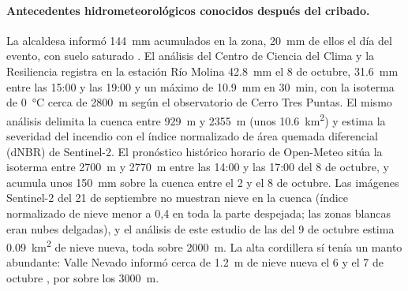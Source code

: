 \paragraph{Antecedentes hidrometeorológicos conocidos después del cribado.} La alcaldesa informó \SI{144}{mm} acumulados en la zona, \SI{20}{mm} de ellos el día del evento, con suelo saturado \citep{interferencia2026}. El análisis del Centro de Ciencia del Clima y la Resiliencia \citep{cr2_2026} registra en la estación Río Molina \SI{42,8}{mm} el 8 de octubre, \SI{31,6}{mm} entre las 15:00 y las 19:00 y un máximo de \SI{10,9}{mm} en \SI{30}{min}, con la isoterma de \SI{0}{\celsius} cerca de \SI{2800}{m} según el observatorio de Cerro Tres Puntas. El mismo análisis delimita la cuenca entre \SI{929}{m} y \SI{2355}{m} (unos \SI{10,6}{km^2}) y estima la severidad del incendio con el índice normalizado de área quemada diferencial (dNBR) de Sentinel-2. El pronóstico histórico horario de Open-Meteo \citep{openmeteo2023} sitúa la isoterma entre \SI{2700}{m} y \SI{2770}{m} entre las 14:00 y las 17:00 del 8 de octubre, y acumula unos \SI{150}{mm} sobre la cuenca entre el 2 y el 8 de octubre. Las imágenes Sentinel-2 \citep{drusch2012} del 21 de septiembre no muestran nieve en la cuenca (índice normalizado de nieve menor a 0,4 en toda la parte despejada; las zonas blancas eran nubes delgadas), y el análisis de este estudio de las del 9 de octubre estima \SI{0,09}{km^2} de nieve nueva, toda sobre \SI{2000}{m}. La alta cordillera sí tenía un manto abundante: Valle Nevado informó cerca de \SI{1,2}{m} de nieve nueva el 6 y el 7 de octubre \citep{emol2026valle}, por sobre los \SI{3000}{m}.

